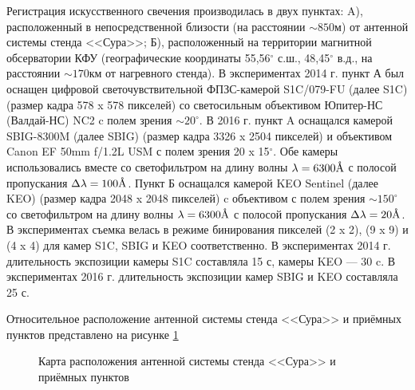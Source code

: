 \documentclass[12pt,a4paper]{article}
\newcommand{\angstrom}{\textup{\AA}}
\begin{document}
Регистрация искусственного свечения производилась в двух пунктах: A), расположенный в непосредственной близости (на расстоянии $\sim850$м) от антенной системы стенда <<Сура>>; Б), расположенный на территории магнитной обсерватории КФУ (географические координаты 55,56$^{\circ}$ с.ш., 48,45$^{\circ}$ в.д., на расстоянии $\sim170$км от нагревного стенда). В экспериментах 2014 г. пункт А был оснащен цифровой светочувствительной ФПЗС-камерой S1C/079-FU (далее S1C) \cite{S1C_specs} (размер кадра 578 x 578 пикселей) со светосильным объективом Юпитер-НС (Валдай-НС) NC2 \cite{NC2_specs} c полем зрения $\sim20^{\circ}$. В 2016 г. пункт A оснащался камерой SBIG-8300M (далее SBIG) \cite{SBIG_specs} (размер кадра 3326 x 2504 пикселей) и объективом Canon EF 50mm f/1.2L USM с полем зрения 20 x 15$^{\circ}$. Обе камеры использовались вместе со светофильтром на длину волны $\lambda=6300\angstrom$ с полосой пропускания $\Delta \lambda = 100\angstrom$. Пункт Б оснащался камерой KEO Sentinel (далее KEO) \cite{KEO_specs} (размер кадра 2048 x 2048 пикселей) c объективом с полем зрения $\sim150^{\circ}$ со светофильтром на длину волны $\lambda=6300\angstrom$ с полосой пропускания $\Delta \lambda = 20\angstrom$. В экспериментах съемка велась в режиме бинирования пикселей (2 x 2), (9 x 9) и (4 x 4) для камер S1C, SBIG и KEO соответственно. В экспериментах 2014 г. длительность экспозиции камеры S1C составляла 15 с, камеры KEO --- 30 c. В экспериментах 2016 г. длительность экспозиции камер SBIG и KEO составляла 25 с.


Относительное расположение антенной системы стенда <<Сура>> и приёмных пунктов представлено на рисунке \ref{fig:fig1}



\begin{figure}[h]
	\caption{Карта расположения антенной системы стенда <<Сура>> и приёмных пунктов}
	\label{fig:fig1}
\end{figure}
\end{document}
